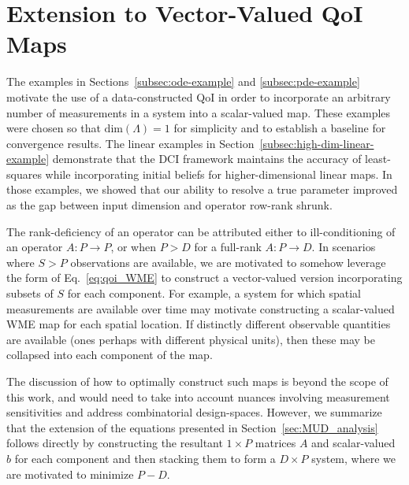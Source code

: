 \section{Extension to Vector-Valued QoI Maps}
The examples in Sections~\ref{subsec:ode-example} and \ref{subsec:pde-example} motivate the use of a data-constructed QoI in order to incorporate an arbitrary number of measurements in a system into a scalar-valued map.
These examples were chosen so that $\text{dim}({\Lambda}) = 1$ for simplicity and to establish a baseline for convergence results.
The linear examples in Section~\ref{subsec:high-dim-linear-example} demonstrate that the DCI framework maintains the accuracy of least-squares while incorporating initial beliefs for higher-dimensional linear maps.
In those examples, we showed that our ability to resolve a true parameter improved as the gap between input dimension and operator row-rank shrunk.

The rank-deficiency of an operator can be attributed either to ill-conditioning of an operator $A:P\to P$, or when $P>D$ for a full-rank $A:P\to D$.
In scenarios where $S>P$ observations are available, we are motivated to somehow leverage the form of Eq.~\eqref{eq:qoi_WME} to construct a vector-valued version incorporating subsets of $S$ for each component.
For example, a system for which spatial measurements are available over time may motivate constructing a scalar-valued WME map for each spatial location.
If distinctly different observable quantities are available (ones perhaps with different physical units), then these may be collapsed into each component of the map.

The discussion of how to optimally construct such maps is beyond the scope of this work, and would need to take into account nuances involving measurement sensitivities and address combinatorial design-spaces.
However, we summarize that the extension of the equations presented in Section~\ref{sec:MUD_analysis} follows directly by constructing the resultant $1\times P$ matrices $A$ and scalar-valued $b$ for each component and then stacking them to form a $D\times P$ system, where we are motivated to minimize $P-D$.



